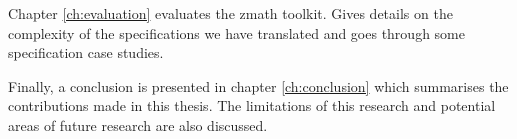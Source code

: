 Chapter \ref{ch:evaluation} evaluates the \gls{zmath} toolkit. Gives details on
the complexity of the specifications we have translated and goes through some
specification case studies.

Finally, a conclusion is presented in chapter \ref{ch:conclusion} which
summarises the contributions made in this thesis. The limitations of this
research and potential areas of future research are also discussed.
